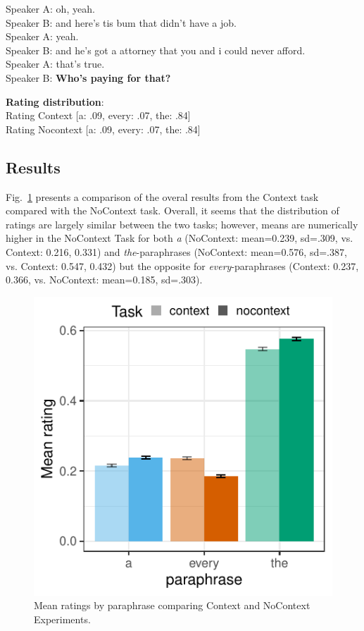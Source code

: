 \documentclass[12pt,letterpaper,table,svgnames,dvipsnames]{article}
\newcommand{\figref}[1]{Fig.~\ref{#1}}
\begin{document}
\begin{exe}
\ex {}
    \begin{xlist}
    \ex {}
    Speaker A: oh, yeah.\\
    Speaker B: and here's tis bum that didn't have a job.\\
    Speaker A: yeah.\\
    Speaker B: and he's got a attorney that you and i could never afford.\\
    Speaker A: that's true.\\
    Speaker B: \textbf{Who's paying for that?}
    
    \ex \textbf{Rating distribution}:\\
    Rating Context [a: .09, every: .07, the: .84]\\
    Rating Nocontext [a: .09, every: .07, the: .84]
    \end{xlist}
\end{exe}





\subsection{Results}

\figref{Task_overall} presents a comparison of the overal results from the Context task compared with the NoContext task. Overall, it seems that the distribution of ratings are largely similar between the two tasks; however, means are numerically higher in the NoContext Task for both \emph{a} (NoContext: mean=0.239, sd=.309, vs. Context: 0.216, 0.331) and \emph{the}-paraphrases (NoContext: mean=0.576, sd=.387, vs. Context: 0.547, 0.432) but the opposite for \emph{every}-paraphrases (Context: 0.237, 0.366, vs. NoContext: mean=0.185, sd=.303). 



\begin{figure}[h!]
\centering
\centering
\includegraphics[scale=1]{figures/overall_Task.pdf}
\caption{Mean ratings by paraphrase comparing Context and NoContext Experiments.}
\label{Task_overall}
\end{figure}
\end{document}
